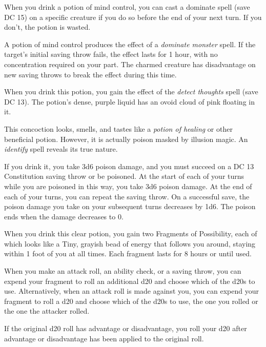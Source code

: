 \documentclass[10pt,a4paper,twoside,bg=print,twocolumn,openany,nodeprecatedcode]{dndbook}
\begin{document}
When you drink a potion of mind control, you can cast a dominate spell (save DC 15) on a specific creature if you do so before the end of your next turn. If you don't, the potion is wasted.

A potion of mind control produces the effect of a \textit{dominate monster} spell. If the target's initial saving throw fails, the effect lasts for 1 hour, with no concentration required on your part. The charmed creature has disadvantage on new saving throws to break the effect during this time.

When you drink this potion, you gain the effect of the \textit{detect thoughts} spell (save DC 13). The potion's dense, purple liquid has an ovoid cloud of pink floating in it.

This concoction looks, smells, and tastes like a \textit{potion of healing} or other beneficial potion. However, it is actually poison masked by illusion magic. An \textit{identify} spell reveals its true nature.

If you drink it, you take 3d6 poison damage, and you must succeed on a DC 13 Constitution saving throw or be poisoned. At the start of each of your turns while you are poisoned in this way, you take 3d6 poison damage. At the end of each of your turns, you can repeat the saving throw. On a successful save, the poison damage you take on your subsequent turns decreases by 1d6. The poison ends when the damage decreases to 0.

When you drink this clear potion, you gain two Fragments of Possibility, each of which looks like a Tiny, grayish bead of energy that follows you around, staying within 1 foot of you at all times. Each fragment lasts for 8 hours or until used.

When you make an attack roll, an ability check, or a saving throw, you can expend your fragment to roll an additional d20 and choose which of the d20s to use. Alternatively, when an attack roll is made against you, you can expend your fragment to roll a d20 and choose which of the d20s to use, the one you rolled or the one the attacker rolled.

If the original d20 roll has advantage or disadvantage, you roll your d20 after advantage or disadvantage has been applied to the original roll.
\end{document}
